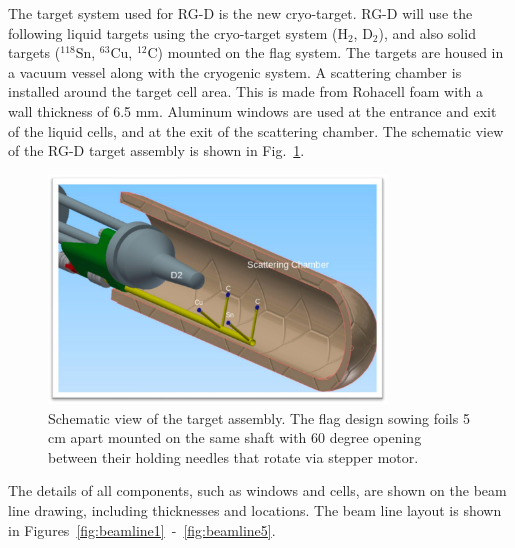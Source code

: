 \documentclass[11pt]{article}
\begin{document}
The target system used for RG-D is the new cryo-target.  RG-D will use the following liquid targets using the cryo-target system (H$_2$, D$_2$), and also solid targets ($^{118}$Sn, $^{63}$Cu, $^{12}$C) mounted on the flag system. The targets are housed in a vacuum vessel along with the cryogenic system.  A scattering chamber is installed around the target cell area.  This is made from Rohacell foam with a wall thickness of 6.5 mm.  Aluminum windows are used at the entrance and exit of the liquid cells, and at the exit of the scattering chamber. The schematic view of the RG-D target assembly is shown in Fig.~\ref{fig:RGDT}. 

\begin{figure}[htb!]
\centering
\includegraphics[width=0.8\textwidth]{RGDtarget.png}
\caption{Schematic view of the target assembly.
The flag design sowing foils 5 cm apart mounted on the same shaft with 60 degree opening between their holding needles that rotate via stepper motor.}
\label{fig:RGDT}
\end{figure}


The details of all components, such as windows and cells, are shown on the beam line drawing, including thicknesses and locations.  The beam line layout is shown in Figures~\ref{fig:beamline1}~-~\ref{fig:beamline5}.
\end{document}
